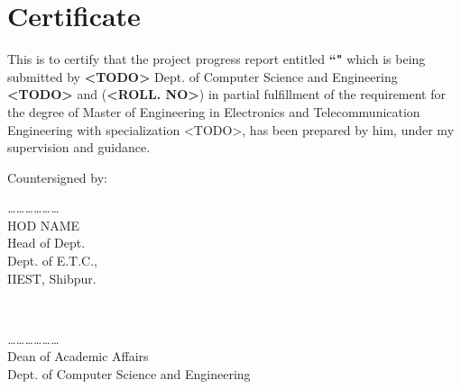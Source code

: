 \chapter*{Certificate}

\begin{justify}
	This is to certify that the project progress report entitled \textbf{``\@title"} which is being submitted by \textbf{<TODO>}
	Dept. of Computer Science and Engineering \textbf{<TODO>} and (\textbf{<ROLL. NO>}) in partial fulfillment of the requirement for the degree
	of Master of Engineering in Electronics and Telecommunication Engineering with
	specialization <TODO>, has been prepared by him, under my
	supervision and guidance.\\[2cm]
\end{justify}

\begin{flushleft}
	Countersigned by:\\[4cm]
\end{flushleft}

\begin{minipage}{0.45\textwidth}
	\begin{flushleft} \large
		\emph{………………}\\
		HOD NAME \\
		Head of Dept.\\
		Dept. of E.T.C.,\\
		IIEST, Shibpur.\\
	\end{flushleft}
\end{minipage}
~
\begin{minipage}{0.45\textwidth}
	\begin{flushright} \large
		\emph{………………}\\

		Dean of Academic Affairs\\
		Dept. of Computer Science and Engineering\\

	\end{flushright}
\end{minipage}

